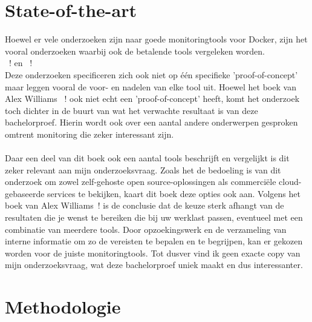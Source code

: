 
\section{State-of-the-art}
\label{sec:state-of-the-art}

Hoewel er vele onderzoeken zijn naar goede monitoringtools voor Docker, zijn het vooral onderzoeken waarbij ook de betalende tools vergeleken worden. \\~\autocite{Ribenzaft2020}! en ~\autocite{Cirelly2020}!\\ Deze onderzoeken specificeren zich ook niet op één specifieke 'proof-of-concept' maar leggen vooral de voor- en nadelen van elke tool uit.
Hoewel het boek van Alex Williams ~\autocite{2015}! ook niet echt een 'proof-of-concept' heeft, komt het onderzoek toch dichter in de buurt van wat het verwachte resultaat is van deze bachelorproef. Hierin wordt ook over een aantal andere onderwerpen gesproken omtrent monitoring die zeker interessant zijn. 
\\
\\
Daar een deel van dit boek ook een aantal tools beschrijft en vergelijkt is dit zeker relevant aan mijn onderzoeksvraag. Zoals het de bedoeling is van dit onderzoek om zowel zelf-gehoste open source-oplossingen als commerciële cloud-gebaseerde services te bekijken, kaart dit boek deze opties ook aan. Volgens het boek van Alex Williams~\autocite{2015}! is de conclusie dat de keuze sterk afhangt van de resultaten die je wenst te bereiken die bij uw werklast passen, eventueel met een combinatie van meerdere tools. Door opzoekingswerk en de verzameling van interne informatie om zo de vereisten te bepalen en te begrijpen, kan er gekozen worden voor de juiste monitoringtools. Tot dusver vind ik geen exacte copy van mijn onderzoeksvraag, wat deze bachelorproef uniek maakt en dus interessanter.


\section{Methodologie}
\label{sec:methodologie}

